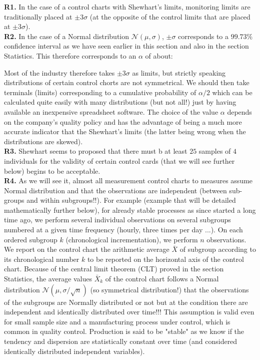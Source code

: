 	\begin{tcolorbox}[title=Remarks,colframe=black,arc=10pt]
	\textbf{R1.} In the case of a control charts with Shewhart's limits, monitoring limits are traditionally placed at $\pm 3\sigma$ (at the opposite of the control limits that are placed at $\pm 3\sigma$).\\
	
	\textbf{R2.} In the case of a Normal distribution $\mathcal{N}(\mu,\sigma)$, $\pm \sigma$ corresponds to a $99.73\%$ confidence interval as we have seen earlier in this section and also in the section Statistics. This therefore corresponds to an $\alpha$ of about:
	
	Most of the industry therefore takes $\pm 3\sigma$ as limits, but strictly speaking distributions of certain control chorts are not symmetrical. We should then take terminals (limits) corresponding to a cumulative probability of $\alpha/2$ which can be calculated quite easily with many distributions (but not all!) just by having available an inexpensive spreadsheet software. The choice of the value $\alpha$ depends on the company's quality policy and has the advantage of being a much more accurate indicator that the Shewhart's limits (the latter being wrong when the distributions are skewed).\\

	\textbf{R3.} Shewhart seems to proposed that there must b at least $25$ samples of $4$ individuals for the validity of certain control cards (that we will see further below) begins to be acceptable.\\
	
	\textbf{R4.} As we will see it, almost all measurement control charts to measures assume Normal distribution and that the observations are independent (between sub-groups and within subgroups!!). For example (example that will be detailed mathematically further below), for already stable processes as since started a long time ago, we perform several individual observations on several subgroups numbered at a given time frequency (hourly, three times per day ...). On each ordered subgroup $k$ (chronological incrementation), we perform $n$ observations. We report on the control chart the arithmetic average $\bar{X}$ of subgroup according to its chronological number $k$ to be reported on the horizontal axis of the control chart. Because of the central limit theorem (CLT) proved in the section Statistics, the average values $\bar{X}_k$ of the control chart follows a Normal distribution $\mathcal{N}(\mu,\sigma/\sqrt{n})$ (so symmetrical distribution!) that the observations of the subgroups are Normally distributed or not but at the condition there are independent and identically distributed over time!!! This assumption is valid even for small sample size and a manufacturing process under control, which is common in quality control. Production is said to be "stable" as we know if the tendency and dispersion are statistically constant over time (and considered identically distributed independent variables).
	\end{tcolorbox}
	
